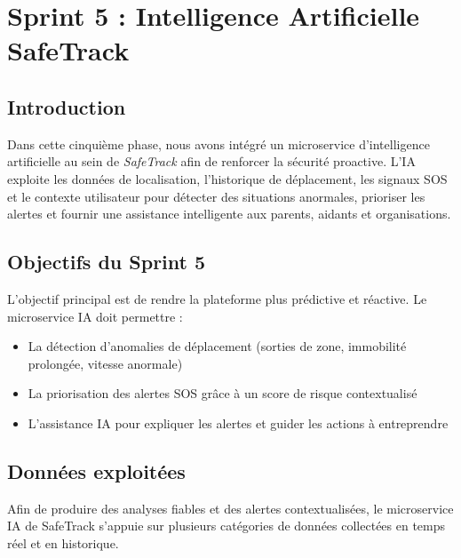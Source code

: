﻿\chapter{Sprint 5 : Intelligence Artificielle SafeTrack}

\DeclareRobustCommand{\greencheck}{%
  \tikz\fill[scale=0.4, color=green]
  (0,.35) -- (.25,0) -- (1,.7) -- (.25,.15) -- cycle;%
}

\minitoc
\newpage

\section*{Introduction}
Dans cette cinquième phase, nous avons intégré un microservice d'intelligence artificielle au sein de \textit{SafeTrack} afin de renforcer la sécurité proactive. L'IA exploite les données de localisation, l'historique de déplacement, les signaux SOS et le contexte utilisateur pour détecter des situations anormales, prioriser les alertes et fournir une assistance intelligente aux parents, aidants et organisations.

\section{Objectifs du Sprint 5}
L'objectif principal est de rendre la plateforme plus prédictive et réactive. Le microservice IA doit permettre :
\begin{itemize}
    \item La détection d'anomalies de déplacement (sorties de zone, immobilité prolongée, vitesse anormale)
    \item La priorisation des alertes SOS grâce à un score de risque contextualisé
    \item L'assistance IA pour expliquer les alertes et guider les actions à entreprendre
\end{itemize}

\section{Données exploitées}

Afin de produire des analyses fiables et des alertes contextualisées, le microservice IA de SafeTrack s'appuie sur plusieurs catégories de données collectées en temps réel et en historique.

